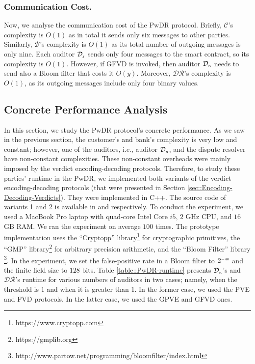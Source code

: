 
\subsubsection{Communication Cost.} Now, we analyse the communication cost of the PwDR protocol. Briefly, $\mathcal{C}$'s complexity is $O(1)$ as in total it sends only six messages to other parties. Similarly, $\mathcal{B}$'s complexity is $O(1)$ as its total number of outgoing messages is only nine. Each auditor $\mathcal{D}_{\scriptscriptstyle j}$ sends only four messages to the smart contract, so its complexity is $O(1)$. However, if GFVD is invoked, then auditor $\mathcal{D}_{\scriptscriptstyle n}$ needs to send also a Bloom filter that costs it $O(y)$. Moreover, $\mathcal{DR}$'s complexity is $O(1)$, as its outgoing messages include only four binary values. 

\subsection{Concrete Performance Analysis}

In this section, we study the PwDR protocol's concrete performance.   As we saw in the previous section, the customer's and bank's complexity is very low and constant; however, one of the auditors, i.e., auditor $\mathcal{D}_{\scriptscriptstyle n}$, and the dispute resolver have non-constant complexities.  These non-constant overheads were mainly imposed by the verdict encoding-decoding protocols. Therefore, to study these parties' runtime in the PwDR, we implemented both variants of the verdict encoding-decoding protocols (that were presented in Section  \ref{sec::Encoding-Decoding-Verdicts}). They were implemented in C++. The source code of  variants 1 and 2 is available in \cite{variant-1} and \cite{variant-2} respectively. To conduct the experiment, we used a MacBook Pro laptop with quad-core Intel Core $i5$, $2$ GHz CPU, and $16$ GB RAM. We ran the experiment on average $100$ times. The prototype implementation uses the ``Cryptopp'' library\footnote{https://www.cryptopp.com}  for cryptographic primitives, the ``GMP'' library\footnote{https://gmplib.org} for arbitrary precision arithmetic, and the ``Bloom Filter'' library \footnote{http://www.partow.net/programming/bloomfilter/index.html}. In the experiment, we set the false-positive rate in a Bloom filter to $2^{\scriptscriptstyle -40}$ and the finite field size to $128$ bits. Table \ref{table::PwDR-runtime} presents    $\mathcal{D}_{\scriptscriptstyle n}$'s and $\mathcal{DR}$'s runtime for various numbers of auditors in two cases; namely, when the threshold is $1$ and when it is greater than $1$. In the former case, we used the PVE and FVD protocols.  In the latter case, we used the GPVE and GFVD ones. 


